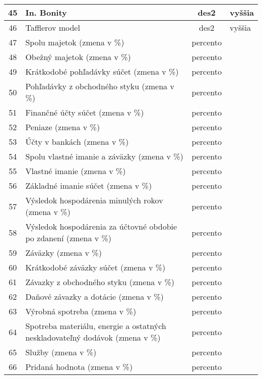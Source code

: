 \begin{longtable}{ |c|p{7cm}|c|p{2.4cm}| }
        \hline
        45 & In. Bonity & des2 & vyššia \\
        \hline
        46 & Tafflerov model & des2 & vyššia \\
        \hline
        47 & Spolu majetok (zmena v \%) & percento &  \\
        \hline
        48 & Obežný majetok (zmena v \%) & percento &  \\
        \hline
        49 & Krátkodobé pohľadávky súčet (zmena v \%) & percento &  \\
        \hline
        50 & Pohľadávky z obchodného styku (zmena v \%) & percento &  \\
        \hline
        51 & Finančné účty súčet (zmena v \%) & percento &  \\
        \hline
        52 & Peniaze (zmena v \%) & percento &  \\
        \hline
        53 & Účty v bankách (zmena v \%) & percento &  \\
        \hline
        54 & Spolu vlastné imanie a záväzky (zmena v \%) & percento &  \\
        \hline
        55 & Vlastné imanie (zmena v \%) & percento &  \\
        \hline
        56 & Základné imanie súčet (zmena v \%) & percento &  \\
        \hline
        57 & Výsledok hospodárenia minulých rokov (zmena v \%) & percento &  \\
        \hline
        58 & Výsledok hospodárenia za účtovné obdobie po zdanení (zmena v \%) & percento &  \\
        \hline
        59 & Záväzky (zmena v \%) & percento &  \\
        \hline
        60 & Krátkodobé záväzky súčet (zmena v \%) & percento &  \\
        \hline
        61 & Závazky z obchodného styku (zmena v \%) & percento &  \\
        \hline
        62 & Daňové závazky a dotácie (zmena v \%) & percento &  \\
        \hline
        63 & Výrobná spotreba (zmena v \%) & percento &  \\
        \hline
        64 & Spotreba materiálu, energie a ostatných neskladovateľný dodávok (zmena v \%) & percento &  \\
        \hline
        65 & Služby (zmena v \%) & percento &  \\
        \hline
        66 & Pridaná hodnota (zmena v \%) & percento &  \\

\end{longtable}
